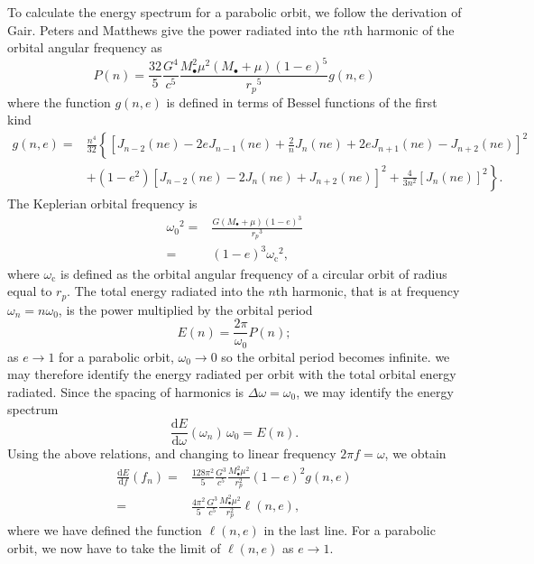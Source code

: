 \documentclass[a4paper, 11pt, titlepage, twoside]{report}
\newcommand{\sub}[1]{\ensuremath{_\mathrm{#1}}}
\newcommand{\dd}{\ensuremath{\mathrm{d}}}
\newcommand{\diff}[2]{\ensuremath{\frac{\dd {#1}}{\dd {#2}}}}
\begin{document}
{To calculate the energy spectrum for a parabolic orbit, we follow the derivation of Gair\cite{Gair2010}. Peters and Matthews give the power radiated into the $n$th harmonic of the orbital angular frequency as
\begin{equation}
P(n) = \frac{32}{5}\frac{G^4}{c^5}\frac{M_\bullet^2\mu^2(M_\bullet + \mu)(1-e)^5}{{r_p}^5}g(n,e)
\label{eq:PM_P}
\end{equation}
where the function $g(n,e)$ is defined in terms of Bessel functions of the first kind
\begin{align}
g(n,e) = {} & \frac{n^4}{32}\left\{\left[J_{n-2}(ne) - 2eJ_{n-1}(ne) + \frac{2}{n}J_n(ne) + 2eJ_{n+1}(ne) - J_{n+2}(ne)\right]^2 \right. \nonumber \\
 & + \left. \left(1 - e^2\right)\left[J_{n-2}(ne) - 2J_n(ne) + J_{n+2}(ne)\right]^2 + \frac{4}{3n^2}\left[J_n(ne)\right]^2\right\}.
\end{align}
The Keplerian orbital frequency is
\begin{align}
{\omega_0}^2 = {} & \frac{G(M_\bullet + \mu)(1-e)^3}{{r_p}^3}\\
 = {} & (1-e)^3{\omega\sub{c}}^2,
\label{eq:Kepler_freq}
\end{align}
where $\omega\sub{c}$ is defined as the orbital angular frequency of a circular orbit of radius equal to $r_p$. The total energy radiated into the $n$th harmonic, that is at frequency $\omega_n = n\omega_0$, is the power multiplied by the orbital period
\begin{equation}
E(n) = \frac{2\pi}{\omega_0}P(n);
\label{eq:E(n)}
\end{equation}
as $e \rightarrow 1$ for a parabolic orbit, $\omega_0 \rightarrow 0$ so the orbital period becomes infinite. we may therefore identify the energy radiated per orbit with the total orbital energy radiated. Since the spacing of harmonics is $\Delta\omega = \omega_0$, we may identify the energy spectrum
\begin{equation}
\diff{E}{\omega}(\omega_n)\, \omega_0 = E(n).
\end{equation}
Using the above relations, and changing to linear frequency $2\pi f = \omega$, we obtain
\begin{align}
\diff{E}{f}(f_n) = {} & \frac{128\pi^2}{5}\frac{G^3}{c^5}\frac{M_\bullet^2\mu^2}{r_p^2}(1-e)^2g(n,e) \\
 = {} & \frac{4\pi^2}{5}\frac{G^3}{c^5}\frac{M_\bullet^2\mu^2}{r_p^2}\ell(n,e),
\label{eq:PM_spectrum}
\end{align}
where we have defined the function $\ell(n,e)$ in the last line. For a parabolic orbit, we now have to take the limit of $\ell(n,e)$ as $e \rightarrow 1$.

}
\end{document}
